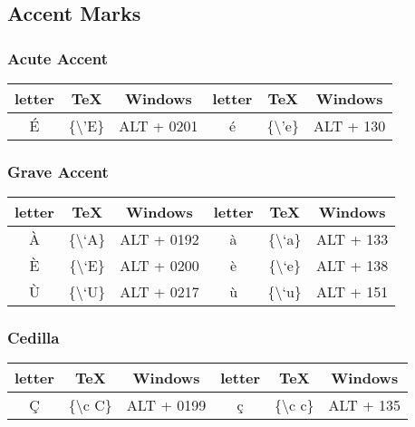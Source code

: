 \subsection{Accent Marks}

\subsubsection{Acute Accent}

\begin{center}\begin{tabular}{|c|c|c||c|c|c|} \hline
  \textbf{letter} & \textbf{TeX} & \textbf{Windows} & \textbf{letter} & \textbf{TeX} & \textbf{Windows} \\ \hline
  {\'E} & \{\textbackslash 'E\} & ALT + 0201 & {\'e} & \{\textbackslash 'e\} & ALT + 130 \\ \hline
\end{tabular}\end{center}

\subsubsection{Grave Accent}

\begin{center}\begin{tabular}{|c|c|c||c|c|c|} \hline
  \textbf{letter} & \textbf{TeX} & \textbf{Windows} & \textbf{letter} & \textbf{TeX} & \textbf{Windows} \\ \hline
  {\`A} & \{\textbackslash `A\} & ALT + 0192 & {\`a} & \{\textbackslash `a\} & ALT + 133 \\ \hline
  {\`E} & \{\textbackslash `E\} & ALT + 0200 & {\`e} & \{\textbackslash `e\} & ALT + 138 \\ \hline
  {\`U} & \{\textbackslash `U\} & ALT + 0217 & {\`u} & \{\textbackslash `u\} & ALT + 151 \\ \hline
\end{tabular}\end{center}

\subsubsection{Cedilla}

\begin{center}\begin{tabular}{|c|c|c||c|c|c|} \hline
  \textbf{letter} & \textbf{TeX} & \textbf{Windows} & \textbf{letter} & \textbf{TeX} & \textbf{Windows} \\ \hline
  {\c C} & \{\textbackslash c C\} & ALT + 0199 & {\c c} & \{\textbackslash c c\} & ALT + 135 \\ \hline
\end{tabular}\end{center}

